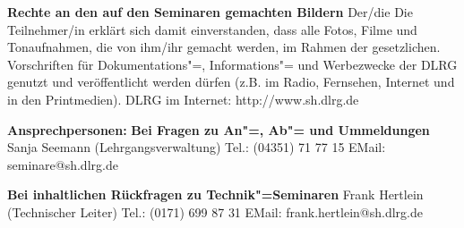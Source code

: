 \textbf{Rechte an den auf den Seminaren gemachten Bildern}\newline
Der/die Die Teilnehmer/in erklärt sich damit einverstanden, dass alle
Fotos, Filme und Tonaufnahmen, die von ihm/ihr gemacht werden,
im Rahmen der gesetzlichen. Vorschriften für 
Dokumentations"=, Informations"= und Werbezwecke der DLRG genutzt und veröffentlicht
werden dürfen (z.B. im Radio, Fernsehen, Internet und in den Printmedien).
\newline
DLRG im Internet: http://www.sh.dlrg.de
\newline
{}

\textbf{Ansprechpersonen:}\newline
\textbf{Bei Fragen zu An"=, Ab"= und Ummeldungen}\newline
Sanja Seemann (Lehrgangsverwaltung)\newline
Tel.: (04351) 71 77 15\newline
EMail: seminare@sh.dlrg.de\newline

\textbf{Bei inhaltlichen Rückfragen zu Technik"=Seminaren}\newline
Frank Hertlein (Technischer Leiter)\newline
Tel.: (0171) 699 87 31\newline
EMail: frank.hertlein@sh.dlrg.de\newline

